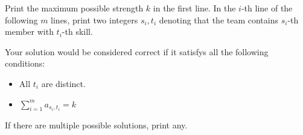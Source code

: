 Print the maximum possible strength $k$ in the first line.
In the $i$-th line of the following $m$ lines, print two integers $s_i,t_i$ denoting that the team contains $s_i$-th member with $t_i$-th skill.

Your solution would be considered correct if it satisfys all the following conditions:
\begin{itemize}
    \item All $t_i$ are distinct.
    \item $\displaystyle \sum_{i=1}^{m} a_{s_i,t_i} = k$
\end{itemize}
If there are multiple possible solutions, print any.